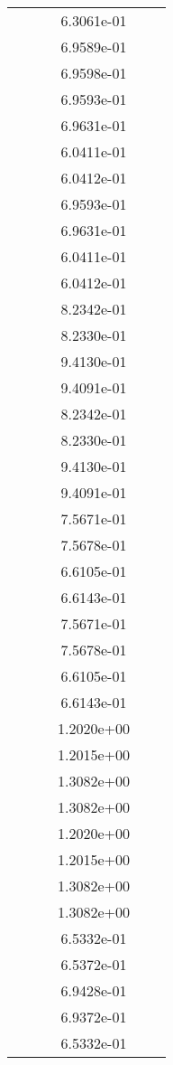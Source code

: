 \begin{xltabular}{\textwidth}{r|rS[table-format=1.3e+2]S[table-format=1.4e+2]S[table-format=1.4e+2]S[table-format=-1.5]}
&  &  & 6.3061e-01 & & \\
&  &  & 6.9589e-01 & & \\
&  &  & 6.9598e-01 & & \\
&  &  & 6.9593e-01 & & \\
&  &  & 6.9631e-01 & & \\
&  &  & 6.0411e-01 & & \\
&  &  & 6.0412e-01 & & \\
&  &  & 6.9593e-01 & & \\
&  &  & 6.9631e-01 & & \\
&  &  & 6.0411e-01 & & \\
&  &  & 6.0412e-01 & & \\
&  &  & 8.2342e-01 & & \\
&  &  & 8.2330e-01 & & \\
&  &  & 9.4130e-01 & & \\
&  &  & 9.4091e-01 & & \\
&  &  & 8.2342e-01 & & \\
&  &  & 8.2330e-01 & & \\
&  &  & 9.4130e-01 & & \\
&  &  & 9.4091e-01 & & \\
&  &  & 7.5671e-01 & & \\
&  &  & 7.5678e-01 & & \\
&  &  & 6.6105e-01 & & \\
&  &  & 6.6143e-01 & & \\
&  &  & 7.5671e-01 & & \\
&  &  & 7.5678e-01 & & \\
&  &  & 6.6105e-01 & & \\
&  &  & 6.6143e-01 & & \\
&  &  & 1.2020e+00 & & \\
&  &  & 1.2015e+00 & & \\
&  &  & 1.3082e+00 & & \\
&  &  & 1.3082e+00 & & \\
&  &  & 1.2020e+00 & & \\
&  &  & 1.2015e+00 & & \\
&  &  & 1.3082e+00 & & \\
&  &  & 1.3082e+00 & & \\
&  &  & 6.5332e-01 & & \\
&  &  & 6.5372e-01 & & \\
&  &  & 6.9428e-01 & & \\
&  &  & 6.9372e-01 & & \\
&  &  & 6.5332e-01 & & \\

\end{xltabular}
